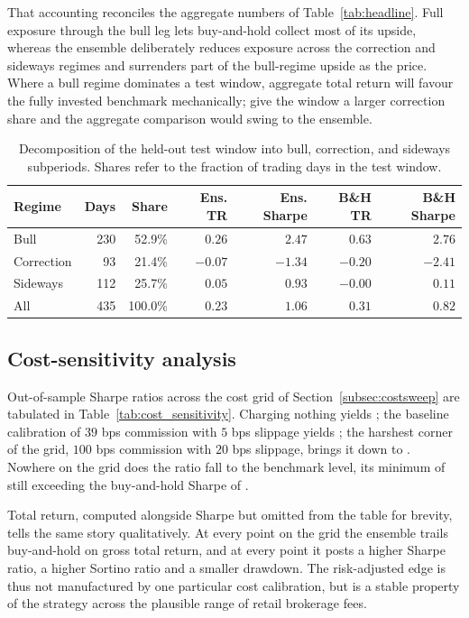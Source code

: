 That accounting reconciles the aggregate numbers of Table~\ref{tab:headline}. Full exposure through the bull leg lets buy-and-hold collect most of its upside, whereas the ensemble deliberately reduces exposure across the correction and sideways regimes and surrenders part of the bull-regime upside as the price. Where a bull regime dominates a test window, aggregate total return will favour the fully invested benchmark mechanically; give the window a larger correction share and the aggregate comparison would swing to the ensemble.

\begin{table}[!htbp]
\centering
\small
\setlength{\tabcolsep}{4pt}
\caption{Decomposition of the held-out test window into bull, correction, and sideways subperiods. Shares refer to the fraction of trading days in the test window.}
\label{tab:regime}
\begin{tabular}{lrrrrrr}
\toprule
\textbf{Regime} & \textbf{Days} & \textbf{Share} & \textbf{Ens. TR} & \textbf{Ens. Sharpe} & \textbf{B\&H TR} & \textbf{B\&H Sharpe} \\
\midrule
Bull & 230 & 52.9\% & $0.26$ & $2.47$ & $0.63$ & $2.76$ \\
Correction & 93 & 21.4\% & $-0.07$ & $-1.34$ & $-0.20$ & $-2.41$ \\
Sideways & 112 & 25.7\% & $0.05$ & $0.93$ & $-0.00$ & $0.11$ \\
All & 435 & 100.0\% & $0.23$ & $1.06$ & $0.31$ & $0.82$ \\
\bottomrule
\end{tabular}
\end{table}

\subsection{Cost-sensitivity analysis}\label{subsec:cost_sensitivity}

Out-of-sample Sharpe ratios across the cost grid of Section~\ref{subsec:costsweep} are tabulated in Table~\ref{tab:cost_sensitivity}. Charging nothing yields \CostZeroSharpe{}; the baseline calibration of $39$ bps commission with $5$ bps slippage yields \CostBaseSharpe{}; the harshest corner of the grid, $100$ bps commission with $20$ bps slippage, brings it down to \CostWorstSharpe{}. Nowhere on the grid does the ratio fall to the benchmark level, its minimum of \CostMinSharpe{} still exceeding the buy-and-hold Sharpe of \BHsharpe{}.

Total return, computed alongside Sharpe but omitted from the table for brevity, tells the same story qualitatively. At every point on the grid the ensemble trails buy-and-hold on gross total return, and at every point it posts a higher Sharpe ratio, a higher Sortino ratio and a smaller drawdown. The risk-adjusted edge is thus not manufactured by one particular cost calibration, but is a stable property of the strategy across the plausible range of retail brokerage fees.

